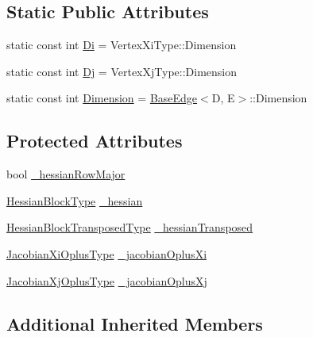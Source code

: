 \subsection*{Static Public Attributes}
\begin{DoxyCompactItemize}
\item 
static const int \mbox{\hyperlink{classg2o_1_1_base_binary_edge_abfe232196405a7204bc299a747c1cc8b}{Di}} = Vertex\+Xi\+Type\+::\+Dimension
\item 
static const int \mbox{\hyperlink{classg2o_1_1_base_binary_edge_ab718b94950a34d589371fe6f5583b259}{Dj}} = Vertex\+Xj\+Type\+::\+Dimension
\item 
static const int \mbox{\hyperlink{classg2o_1_1_base_binary_edge_af3c134948e48c446762fa4e427d1cca5}{Dimension}} = \mbox{\hyperlink{classg2o_1_1_base_edge}{Base\+Edge}}$<$D, E$>$\+::Dimension
\end{DoxyCompactItemize}
\subsection*{Protected Attributes}
\begin{DoxyCompactItemize}
\item 
bool \mbox{\hyperlink{classg2o_1_1_base_binary_edge_aeb5c1f09a4433a6bd76ce4ab67bd9a64}{\+\_\+hessian\+Row\+Major}}
\item 
\mbox{\hyperlink{classg2o_1_1_base_binary_edge_a7eadbbe6abffe4d2ebdf6231272789a5}{Hessian\+Block\+Type}} \mbox{\hyperlink{classg2o_1_1_base_binary_edge_a5036f75e3b20c79cb014fcc929d8eef9}{\+\_\+hessian}}
\item 
\mbox{\hyperlink{classg2o_1_1_base_binary_edge_aec0d5b1819f702b7658574fcd6324b49}{Hessian\+Block\+Transposed\+Type}} \mbox{\hyperlink{classg2o_1_1_base_binary_edge_aa61657904b00fcfa19df382094386f11}{\+\_\+hessian\+Transposed}}
\item 
\mbox{\hyperlink{classg2o_1_1_base_binary_edge_ab1cde84224b129603bcd95db027e0167}{Jacobian\+Xi\+Oplus\+Type}} \mbox{\hyperlink{classg2o_1_1_base_binary_edge_aa21b9d84924ec93192374761ee0adfa7}{\+\_\+jacobian\+Oplus\+Xi}}
\item 
\mbox{\hyperlink{classg2o_1_1_base_binary_edge_a83e5dec2135b33e86255c87be3b5d062}{Jacobian\+Xj\+Oplus\+Type}} \mbox{\hyperlink{classg2o_1_1_base_binary_edge_ad448518247044496cb99c9d70bd1a363}{\+\_\+jacobian\+Oplus\+Xj}}
\end{DoxyCompactItemize}
\subsection*{Additional Inherited Members}



